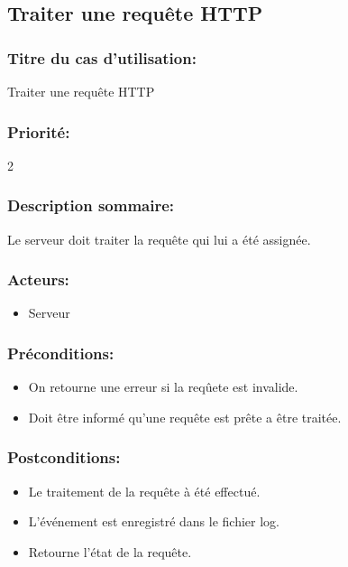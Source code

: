 \documentclass{scrreprt}
\begin{document}
\subsection{Traiter une requête HTTP}
\subsubsection{Titre du cas d'utilisation:} Traiter une requête HTTP
\subsubsection{Priorité:} 2
\subsubsection{Description sommaire:} Le serveur doit traiter la requête qui lui a été assignée.
\subsubsection{Acteurs:}
\begin{itemize}
    \item Serveur
\end{itemize}
\subsubsection{Préconditions:}
\begin{itemize}
    \item On retourne une erreur si la reqûete est invalide.
    \item Doit être informé qu'une requête est prête a être traitée.  
\end{itemize} 
\subsubsection{Postconditions:}
\begin{itemize}
    \item Le traitement de la requête à été effectué.
    \item L'événement est enregistré dans le fichier log. 
    \item Retourne l'état de la requête.    
\end{itemize} 
\end{document}
